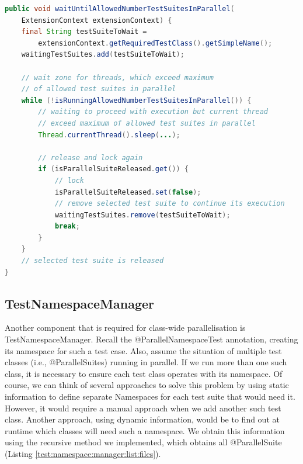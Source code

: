 \begin{lstlisting}[language=Java,label=parallel:suite:sync,caption=Additional synchronization for multiple @ParallelSuite\, that exceed our configured parallelism limit and are spawned by ForkJoinPool,frame=tb]
public void waitUntilAllowedNumberTestSuitesInParallel(
    ExtensionContext extensionContext) {
    final String testSuiteToWait =
        extensionContext.getRequiredTestClass().getSimpleName();
    waitingTestSuites.add(testSuiteToWait);

    // wait zone for threads, which exceed maximum
    // of allowed test suites in parallel
    while (!isRunningAllowedNumberTestSuitesInParallel()) {
        // waiting to proceed with execution but current thread
        // exceed maximum of allowed test suites in parallel
        Thread.currentThread().sleep(...);

        // release and lock again
        if (isParallelSuiteReleased.get()) {
            // lock
            isParallelSuiteReleased.set(false);
            // remove selected test suite to continue its execution
            waitingTestSuites.remove(testSuiteToWait);
            break;
        }
    }
    // selected test suite is released
}
\end{lstlisting}

\subsection{TestNamespaceManager}

Another component that is required for class-wide parallelisation is TestNamespaceManager.
Recall the @ParallelNamespaceTest annotation, creating its namespace for such a test case.
Also, assume the situation of multiple test classes (i.e., @ParallelSuites) running in parallel.
If we run more than one such class, it is necessary to ensure each test class operates with its namespace.
Of course, we can think of several approaches to solve this problem by using static information to define separate Namespaces
for each test suite that would need it. However, it would require a manual approach when we add another such test class.
Another approach, using dynamic information, would be to find out at runtime which classes will need such a namespace.
We obtain this information using the recursive method we implemented, which obtains all @ParallelSuite (Listing \ref{test:namespace:manager:list:files}).


